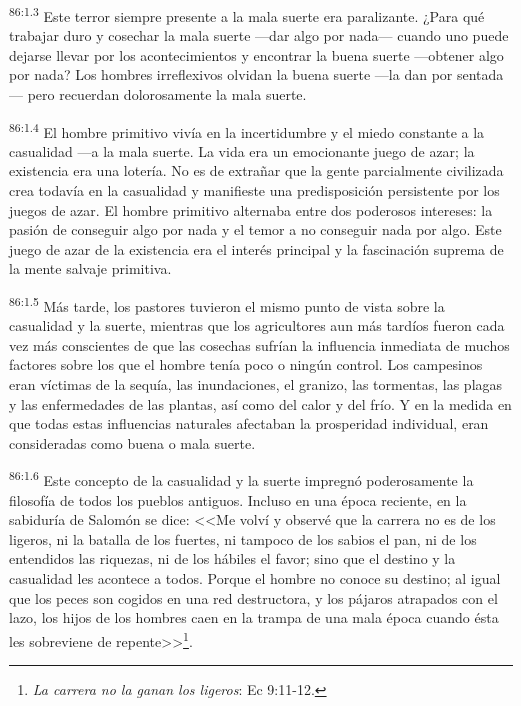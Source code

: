 \par
\textsuperscript{86:1.3} Este terror siempre presente a la mala suerte era paralizante. ¿Para qué trabajar duro y cosechar la mala suerte ---dar algo por nada--- cuando uno puede dejarse llevar por los acontecimientos y encontrar la buena suerte ---obtener algo por nada? Los hombres irreflexivos olvidan la buena suerte ---la dan por sentada--- pero recuerdan dolorosamente la mala suerte.

\par
\textsuperscript{86:1.4} El hombre primitivo vivía en la incertidumbre y el miedo constante a la casualidad ---a la mala suerte. La vida era un emocionante juego de azar; la existencia era una lotería. No es de extrañar que la gente parcialmente civilizada crea todavía en la casualidad y manifieste una predisposición persistente por los juegos de azar. El hombre primitivo alternaba entre dos poderosos intereses: la pasión de conseguir algo por nada y el temor a no conseguir nada por algo. Este juego de azar de la existencia era el interés principal y la fascinación suprema de la mente salvaje primitiva.

\par
\textsuperscript{86:1.5} Más tarde, los pastores tuvieron el mismo punto de vista sobre la casualidad y la suerte, mientras que los agricultores aun más tardíos fueron cada vez más conscientes de que las cosechas sufrían la influencia inmediata de muchos factores sobre los que el hombre tenía poco o ningún control. Los campesinos eran víctimas de la sequía, las inundaciones, el granizo, las tormentas, las plagas y las enfermedades de las plantas, así como del calor y del frío. Y en la medida en que todas estas influencias naturales afectaban la prosperidad individual, eran consideradas como buena o mala suerte.

\par
\textsuperscript{86:1.6} Este concepto de la casualidad y la suerte impregnó poderosamente la filosofía de todos los pueblos antiguos. Incluso en una época reciente, en la sabiduría de Salomón se dice: <<Me volví y observé que la carrera no es de los ligeros, ni la batalla de los fuertes, ni tampoco de los sabios el pan, ni de los entendidos las riquezas, ni de los hábiles el favor; sino que el destino y la casualidad les acontece a todos. Porque el hombre no conoce su destino; al igual que los peces son cogidos en una red destructora, y los pájaros atrapados con el lazo, los hijos de los hombres caen en la trampa de una mala época cuando ésta les sobreviene de repente>>\footnote{\textit{La carrera no la ganan los ligeros}: Ec 9:11-12.}.

